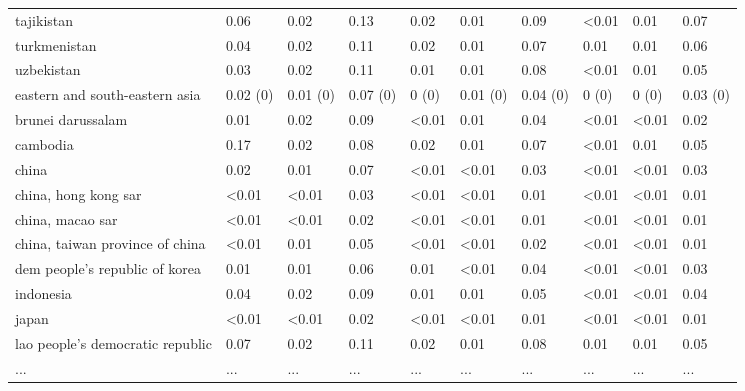 \begin{table}[!h]
\begin{tabular}[t]{llllllllll}
\addlinespace
tajikistan & 0.06 & 0.02 & 0.13 & 0.02 & 0.01 & 0.09 & <0.01 & 0.01 & 0.07\\
turkmenistan & 0.04 & 0.02 & 0.11 & 0.02 & 0.01 & 0.07 & 0.01 & 0.01 & 0.06\\
uzbekistan & 0.03 & 0.02 & 0.11 & 0.01 & 0.01 & 0.08 & <0.01 & 0.01 & 0.05\\
eastern and south-eastern asia & 0.02 (0) & 0.01 (0) & 0.07 (0) & 0 (0) & 0.01 (0) & 0.04 (0) & 0 (0) & 0 (0) & 0.03 (0)\\
brunei darussalam & 0.01 & 0.02 & 0.09 & <0.01 & 0.01 & 0.04 & <0.01 & <0.01 & 0.02\\
\addlinespace
cambodia & 0.17 & 0.02 & 0.08 & 0.02 & 0.01 & 0.07 & <0.01 & 0.01 & 0.05\\
china & 0.02 & 0.01 & 0.07 & <0.01 & <0.01 & 0.03 & <0.01 & <0.01 & 0.03\\
china, hong kong sar & <0.01 & <0.01 & 0.03 & <0.01 & <0.01 & 0.01 & <0.01 & <0.01 & 0.01\\
china, macao sar & <0.01 & <0.01 & 0.02 & <0.01 & <0.01 & 0.01 & <0.01 & <0.01 & 0.01\\
china, taiwan province of china & <0.01 & 0.01 & 0.05 & <0.01 & <0.01 & 0.02 & <0.01 & <0.01 & 0.01\\
\addlinespace
dem people's republic of korea & 0.01 & 0.01 & 0.06 & 0.01 & <0.01 & 0.04 & <0.01 & <0.01 & 0.03\\
indonesia & 0.04 & 0.02 & 0.09 & 0.01 & 0.01 & 0.05 & <0.01 & <0.01 & 0.04\\
japan & <0.01 & <0.01 & 0.02 & <0.01 & <0.01 & 0.01 & <0.01 & <0.01 & 0.01\\
lao people's democratic republic & 0.07 & 0.02 & 0.11 & 0.02 & 0.01 & 0.08 & 0.01 & 0.01 & 0.05\\
... & ... & ... & ... & ... & ... & ... & ... & ... & ...\\
\bottomrule
\end{tabular}
\end{table}
